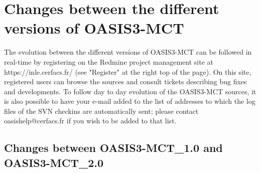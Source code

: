 \newpage

\chapter{Changes between the different versions of OASIS3-MCT}
\label{sec_changes}

The evolution between the different versions of OASIS3-MCT can be
followed in real-time by registering on the Redmine project management
site at https://inle.cerfacs.fr/ (see "Register" at the right top of
the page). On this site, registered users can browse the sources and
consult tickets describing bug fixes and developments. To follow day
to day evolution of the OASIS3-MCT sources, it is also possible to
have your e-mail added to the list of addresses to which the log files
of the SVN checkins are automatically sent; please contact
oasishelp@cerfacs.fr if you wish to be added to that list.

\section{Changes between OASIS3-MCT\_1.0 and OASIS3-MCT\_2.0}
\label{sec_oa1_oa2}

